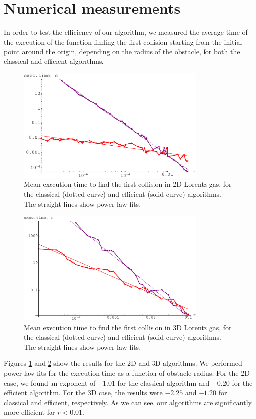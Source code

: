 \documentclass{iopart}
\begin{document}
\section{Numerical measurements}

In order to test the efficiency of our algorithm, we measured the average time of the execution of the function finding the first collision starting from the initial point around the origin,
 depending on the radius of the obstacle, for both the classical and efficient algorithms.

\begin{figure}
\centering
\includegraphics [width=260pt]{fig03.pdf}
\caption{Mean execution time to find the first collision in 2D Lorentz gas, for the classical (dotted curve) and efficient (solid curve) algorithms. The straight lines show power-law fits. }
\label{fig:time_2D}
\end{figure}

\begin{figure}
\centering
\includegraphics [width=260pt]{fig04.pdf}
\caption{Mean execution time to find the first collision in 3D Lorentz gas, for the classical (dotted curve) and efficient (solid curve) algorithms. The straight lines show power-law fits.}
\label{fig:time_3D}
\end{figure}

Figures \ref{fig:time_2D} and \ref{fig:time_3D} show the results for the 2D and 3D algorithms. We performed power-law fits for the execution time as a function of obstacle radius. For the 2D case, we found an exponent of $-1.01$ for the classical algorithm and $-0.20$ for the efficient algorithm. For the 3D case, the results were $-2.25$ and $-1.20$ for classical and efficient, respectively. As we can see, our algorithms are significantly more efficient for $r < 0.01$. 
\end{document}
